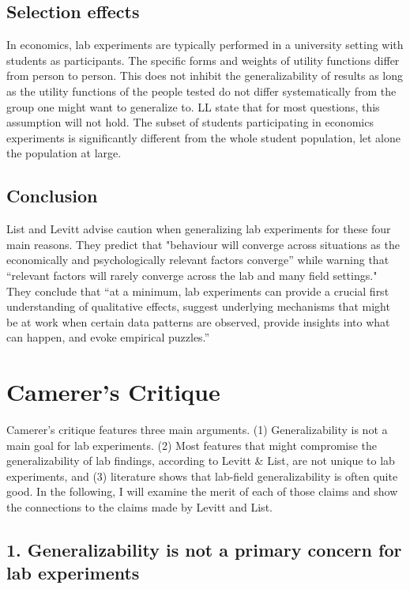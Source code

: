\documentclass{article}
\begin{document}
\subsection*{Selection effects}

In economics, lab experiments are typically performed in a university setting with students as participants. The specific forms and weights of utility functions differ from person to person. This does not inhibit the generalizability of results as long as the utility functions of the people tested do not differ systematically from the group one might want to generalize to. LL state that for most questions, this assumption will not hold. The subset of students participating in economics experiments is significantly different from the whole student population, let alone the population at large. 

\subsection*{Conclusion}

List and Levitt advise caution when generalizing lab experiments for these four main reasons. They predict that "behaviour will converge across situations as the economically and psychologically relevant factors converge” while warning that “relevant factors will rarely converge across the lab and many field settings." They conclude that “at a minimum, lab experiments can provide a crucial first understanding of qualitative effects, suggest underlying mechanisms that might be at work when certain data patterns are observed, provide insights into what can happen, and evoke empirical puzzles.” \citep{Levitt.2007}

\section*{Camerer’s Critique}

Camerer’s critique \citeyear{Camerer.2011} features three main arguments. (1) Generalizability is not a main goal for lab experiments. (2) Most features that might compromise the generalizability of lab findings, according to Levitt \& List, are not unique to lab experiments, and (3) literature shows that lab-field generalizability is often quite good. In the following, I will examine the merit of each of those claims and show the connections to the claims made by Levitt and List. 

\subsection*{1. Generalizability is not a primary concern for lab experiments}
\end{document}
